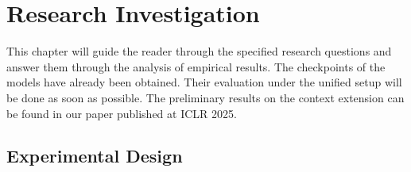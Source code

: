 \chapter{Research Investigation}  %

This chapter will guide the reader through the specified research questions and answer them through the analysis of empirical results. The checkpoints of the models have already been obtained. Their evaluation under the unified setup will be done as soon as possible. The preliminary results on the context extension can be found in our paper \parencite{sapronov2025} published at ICLR 2025.

\section{Experimental Design}

